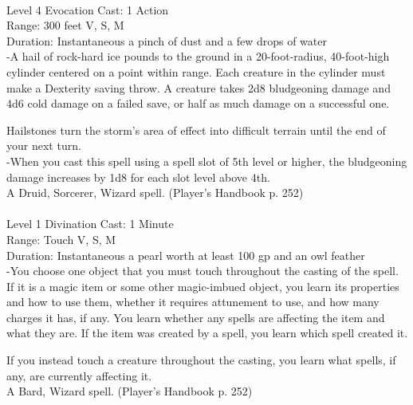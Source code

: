 \documentclass[10pt,twocolumn]{report}
\begin{document}
 \\
Level 4 \quad Evocation \quad Cast: 1 Action\\
Range: 300 feet \quad V, S, M\\
Duration: Instantaneous \quad a pinch of dust and a few drops of water\\
-A hail of rock-hard ice pounds to the ground in a 20-foot-radius, 40-foot-high cylinder centered on a point within range. 
Each creature in the cylinder must make a Dexterity saving throw. A creature takes 2d8 bludgeoning damage and 4d6 cold damage on a failed save, or half as much damage on a successful one.

Hailstones turn the storm’s area of effect into difficult terrain until the end of your next turn.\\
-When you cast this spell using a spell slot of 5th level or higher, the bludgeoning damage increases by 1d8 for each slot level above 4th.\\
A Druid, Sorcerer, Wizard spell. (Player's Handbook p. 252) \\


 \\
Level 1 \quad Divination \quad Cast: 1 Minute\\
Range: Touch \quad V, S, M\\
Duration: Instantaneous \quad a pearl worth at least 100 gp and an owl feather\\
-You choose one object that you must touch throughout the casting of the spell. If it is a magic item or some other magic-imbued object, you learn its properties and how to use them, whether it requires attunement to use, and how many charges it has, if any. You learn whether any spells are affecting the item and what they are. If the item was created by a spell, you learn which spell created it.

If you instead touch a creature throughout the casting, you learn what spells, if any, are currently affecting it.\\
A Bard, Wizard spell. (Player's Handbook p. 252) \\
\end{document}

